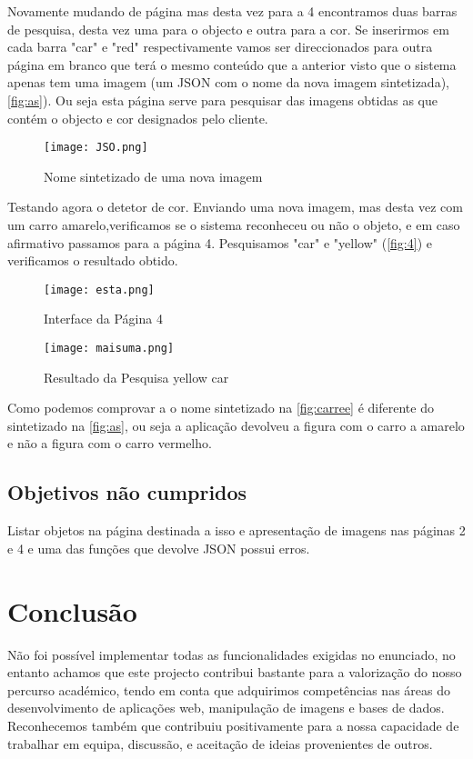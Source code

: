 \documentclass{report}
\begin{document}
Novamente mudando de página mas desta vez para a 4 encontramos duas barras de pesquisa, desta vez uma para o objecto e outra para a cor. Se inserirmos em cada barra "car" e "red" respectivamente vamos ser direccionados para outra página em branco que terá o mesmo conteúdo que a anterior visto que o sistema apenas tem uma imagem (um JSON com o nome da nova imagem sintetizada), \autoref{fig:as}). Ou seja esta página serve para pesquisar das imagens obtidas as que contém o objecto e cor designados pelo cliente.

\begin{figure}[h]
\center %
\texttt{[image: JSO.png]}
\caption{Nome sintetizado de uma nova imagem}
\label{fig:as}
\end{figure}


Testando agora o detetor de cor. Enviando uma nova imagem, mas desta vez com um carro amarelo,verificamos se o sistema reconheceu ou não o objeto, e em caso afirmativo passamos para a página 4. Pesquisamos "car" e "yellow" (\autoref{fig:4}) e verificamos o resultado obtido.


\begin{figure}[h]
\center %
\texttt{[image: esta.png]}
\caption{Interface da Página 4}
\label{fig:4}
\end{figure}


\begin{figure}[h]
\center %
\texttt{[image: maisuma.png]}
\caption{Resultado da Pesquisa yellow car}
\label{fig:carree}
\end{figure}

Como podemos comprovar a o nome sintetizado na \autoref{fig:carree} é diferente do sintetizado na \autoref{fig:as}, ou seja a aplicação devolveu a figura com o carro a amarelo e não a figura com o carro vermelho.




\section{Objetivos não cumpridos}

Listar objetos na página destinada a isso e apresentação de imagens nas páginas 2 e 4 e uma das funções que devolve JSON possui erros.  





\chapter{Conclusão}
\label{chap.conclusao}
 Não foi possível implementar todas as funcionalidades exigidas no enunciado, no entanto achamos que este projecto contribui bastante para a valorização do nosso percurso académico, tendo em conta que adquirimos competências nas áreas do desenvolvimento de aplicações web, manipulação de imagens e bases de dados. Reconhecemos também que contribuiu positivamente para a nossa capacidade de trabalhar em equipa, discussão, e aceitação de ideias provenientes de outros.
 
\end{document}
